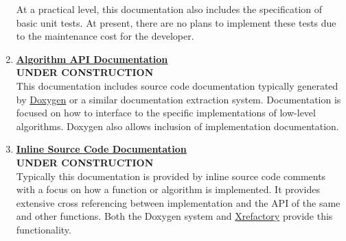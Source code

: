 \documentclass[12pt]{article}
\begin{document}
\begin{enumerate}
  At a practical level, this documentation also includes the
  specification of basic unit tests.  At present, there are no plans to implement these tests due to the
  maintenance cost for the developer.

\item \href{../document-level6/document-level6.pdf}{\bf \underline{Algorithm API Documentation}}\\
{\bf UNDER CONSTRUCTION}\\
  This documentation includes source code
  documentation typically generated by \href{http://www.stack.nl/~dimitri/doxygen/}{Doxygen} or a similar
  documentation extraction system.  Documentation is focused on how to interface
  to the specific implementations of low-level algorithms. Doxygen
  also allows inclusion of implementation documentation.

\item \href{../doccument-level7/document-level-7.pdf}{\bf \underline{Inline Source Code Documentation}}\\
{\bf UNDER CONSTRUCTION}\\
  Typically this documentation is provided by inline source code comments with a focus on how a function
  or algorithm is implemented.  It provides extensive cross referencing between
  implementation and the API of the same and other functions.
  Both the Doxygen system and \href {http://www.xref.sk/xrefactory/main.html}{Xrefactory} provide this
  functionality.
  








\end{enumerate}
\end{document}
